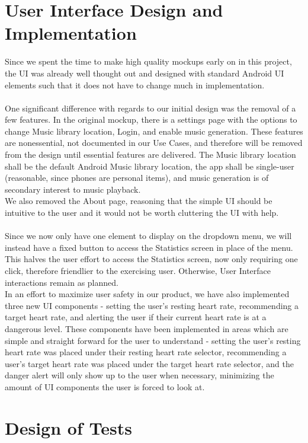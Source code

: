 \documentclass[letterpaper,english, 12pt]{scrreprt}
\begin{document}
\chapter{User Interface Design and Implementation}
Since we spent the time to make high quality mockups early on in this project, the UI was already well thought out and designed with standard Android UI elements such that it does not have to change much in implementation.\\
\\
One significant difference with regards to our initial design was the removal of a few features.
In the original mockup, there is a settings page with the options to change Music library location, Login, and enable music generation.
These features are nonessential, not documented in our Use Cases, and therefore will be removed from the design until essential features are delivered.
The Music library location shall be the default Android Music library location, the app shall be single-user (reasonable, since phones are personal items), and music generation is of secondary interest to music playback.\\
We also removed the About page, reasoning that the simple UI should be intuitive to the user and it would not be worth cluttering the UI with help.\\
\\
Since we now only have one element to display on the dropdown menu, we will instead have a fixed button to access the Statistics screen in place of the menu.
This halves the user effort to access the Statistics screen, now only requiring one click, therefore friendlier to the exercising user.
Otherwise, User Interface interactions remain as planned.\\
In an effort to maximize user safety in our product, we have also implemented three new UI components - setting the user's resting heart rate, recommending a target heart rate, and alerting the user if their current heart rate is at a dangerous level. These components have been implemented in areas which are simple and straight forward for the user to understand - setting the user's resting heart rate was placed under their resting heart rate selector, recommending a user's target heart rate was placed under the target heart rate selector, and the danger alert will only show up to the user when necessary, minimizing the amount of UI components the user is forced to look at.

\chapter{Design of Tests}
\end{document}
